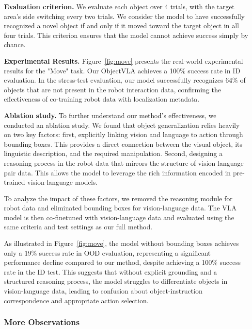 \noindent
\textbf{Evaluation criterion.} We evaluate each object over 4 trials, with the target area's side switching every two trials. We consider the model to have successfully recognized a novel object if and only if it moved toward the target object in all four trials. This criterion ensures that the model cannot achieve success simply by chance. 



\noindent
\textbf{Experimental Results.} Figure~\ref{fig:move} presents the real-world experimental results for the "Move" task. Our ObjectVLA achieves a 100\% success rate in ID evaluation. In the stress-test evaluation, our model successfully recognizes 64\% of objects that are not present in the robot interaction data, confirming the effectiveness of co-training robot data with localization metadata.

\noindent
\textbf{Ablation study.} To further understand our method's effectiveness, we conducted an ablation study. We found that object generalization relies heavily on two key factors: first, explicitly linking vision and language to action through bounding boxes. This provides a direct connection between the visual object, its linguistic description, and the required manipulation. Second, designing a reasoning process in the robot data that mirrors the structure of vision-language pair data. This allows the model to leverage the rich information encoded in pre-trained vision-language models.

To analyze the impact of these factors, we removed the reasoning module for robot data and eliminated bounding boxes for vision-language data. The VLA model is then co-finetuned with vision-language data and evaluated using the same criteria and test settings as our full method.

As illustrated in Figure~\ref{fig:move}, the model without bounding boxes achieves only a 19\% success rate in OOD evaluation, representing a significant performance decline compared to our method, despite achieving a 100\% success rate in the ID test. This suggests that without explicit grounding and a structured reasoning process, the model struggles to differentiate objects in vision-language data, leading to confusion about object-instruction correspondence and appropriate action selection.

\subsubsection{More Observations}

